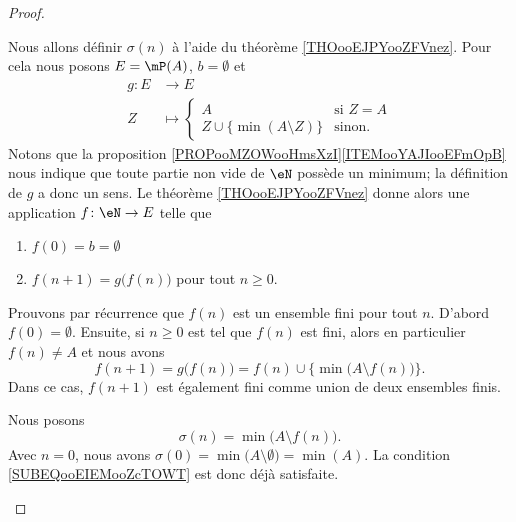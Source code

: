 \begin{proof}
\begin{subproof}
    Nous allons définir \( \sigma(n)\) à l'aide du théorème \ref{THOooEJPYooZFVnez}. Pour cela nous posons \( E=\mP(A)\), \( b=\emptyset\) et
    \begin{equation}
        \begin{aligned}
            g\colon E&\to E \\
            Z&\mapsto \begin{cases}
                A    &   \text{si } Z=A\\
                Z\cup\{ \min(A\setminus Z) \}    &    \text{sinon. }
            \end{cases}
        \end{aligned}
    \end{equation}
    Notons que la proposition \ref{PROPooMZOWooHmsXzI}\ref{ITEMooYAJIooEFmOpB} nous indique que toute partie non vide de \( \eN\) possède un minimum; la définition de \( g\) a donc un sens. Le théorème \ref{THOooEJPYooZFVnez} donne alors une application \( f\colon \eN\to E\) telle que
    \begin{enumerate}
        \item
            \( f(0)=b=\emptyset\)
        \item
            \( f(n+1)=g\big( f(n) \big)\) pour tout \( n\geq 0\).
    \end{enumerate}
    Prouvons par récurrence que \( f(n)\) est un ensemble fini pour tout \( n\). D'abord \( f(0)=\emptyset\). Ensuite, si \( n\geq 0\) est tel que \( f(n)\) est fini, alors en particulier \( f(n)\neq A\) et nous avons
    \begin{equation}
        f(n+1)=g\big( f(n) \big)=f(n)\cup\{ \min\big( A\setminus f(n) \big)\}.
    \end{equation}
    Dans ce cas, \( f(n+1)\) est également fini comme union de deux ensembles finis.

    Nous posons
    \begin{equation}        \label{EQooGHQHooRnXDdo}
        \sigma(n)=\min\big( A\setminus f(n) \big).
    \end{equation}
    Avec \( n=0\), nous avons \( \sigma(0)=\min\big( A\setminus \emptyset \big)=\min(A)\). La condition \eqref{SUBEQooEIEMooZcTOWT} est donc déjà satisfaite.


\end{subproof}
\end{proof}
